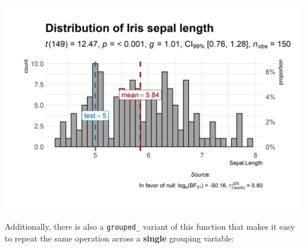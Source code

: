 \documentclass[]{article}
\begin{document}
\includegraphics[width=1\linewidth]{./figures/paper-gghistostats1-1}

Additionally, there is also a \texttt{grouped\_} variant of this function that makes it
easy to repeat the same operation across a \textbf{single} grouping variable:
\end{document}
